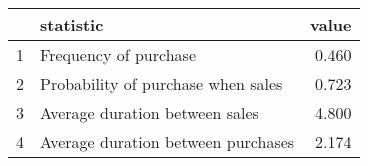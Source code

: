 \begin{tabular}{rlr}
  \hline
 & statistic & value \\ 
  \hline
1 & Frequency of purchase & 0.460 \\ 
  2 & Probability of purchase when sales & 0.723 \\ 
  3 & Average duration between sales & 4.800 \\ 
  4 & Average duration between purchases & 2.174 \\ 
   \hline
\end{tabular}
